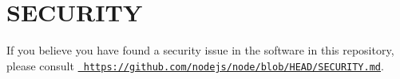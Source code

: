 \chapter{SECURITY}
\hypertarget{md__d_1_2_g_i_t_2_food_link_2foodlink_8client_2node__modules_2node-gyp_2_s_e_c_u_r_i_t_y}{}\label{md__d_1_2_g_i_t_2_food_link_2foodlink_8client_2node__modules_2node-gyp_2_s_e_c_u_r_i_t_y}
If you believe you have found a security issue in the software in this repository, please consult \href{https://github.com/nodejs/node/blob/HEAD/SECURITY.md}{\texttt{ https\+://github.\+com/nodejs/node/blob/\+HEAD/\+SECURITY.\+md}}. 